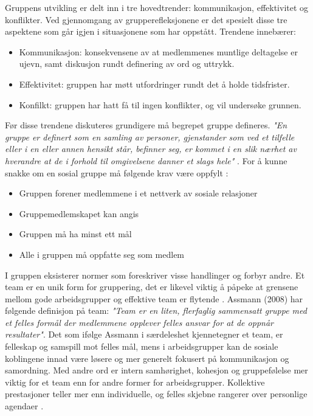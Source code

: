Gruppens utvikling er delt inn i tre hovedtrender: kommunikasjon, effektivitet og konflikter.
Ved gjennomgang av grupperefleksjonene er det spesielt disse tre aspektene som går igjen i situasjonene som har oppstått. Trendene innebærer:

\begin{itemize}
\item Kommunikasjon: konsekvensene av at medlemmenes muntlige deltagelse er ujevn, samt diskusjon rundt definering av ord og uttrykk.
\item Effektivitet: gruppen har møtt utfordringer rundt det å holde tidsfrister.
\item Konfilkt: gruppen har hatt få til ingen konflikter, og vil undersøke grunnen.
\end{itemize}

Før disse trendene diskuteres grundigere må begrepet gruppe defineres. 
\emph{"En gruppe er definert som en samling av personer, gjenstander som ved et tilfelle eller i en eller annen hensikt står, befinner seg, er kommet i en slik nærhet av hverandre at de i forhold til omgivelsene danner et slags hele"} \cite{prosjekteringsledelse}.
For å kunne snakke om en sosial gruppe må følgende krav være oppfylt \cite{orgorg}:
\begin{itemize}
\item Gruppen forener medlemmene i et nettverk av sosiale relasjoner
\item Gruppemedlemskapet kan angis
\item Gruppen må ha minst ett mål
\item Alle i gruppen må oppfatte seg som medlem
\end{itemize}
I gruppen eksisterer normer som foreskriver visse handlinger og forbyr andre.
Et team er en unik form for gruppering, det er likevel viktig å påpeke at grensene mellom gode arbeidsgrupper og effektive team er flytende \cite{orgorg}.
Assmann (2008) har følgende definisjon på team: \emph{"Team er en liten, flerfaglig sammensatt gruppe med et felles formål der medlemmene opplever felles ansvar for at de oppnår resultater"}.
Det som ifølge Assmann i særdeleshet kjennetegner et team, er felleskap og samspill mot felles mål, mens i arbeidsgrupper kan de sosiale koblingene innad være løsere og mer generelt fokusert på kommunikasjon og samordning.
Med andre ord er intern samhørighet, kohesjon og gruppefølelse mer viktig for et team enn for andre former for arbeidsgrupper.
Kollektive prestasjoner teller mer enn individuelle, og felles skjebne rangerer over personlige agendaer \cite{orgorg}.